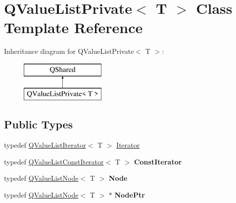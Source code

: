\hypertarget{class_q_value_list_private}{}\section{Q\+Value\+List\+Private$<$ T $>$ Class Template Reference}
\label{class_q_value_list_private}
Inheritance diagram for Q\+Value\+List\+Private$<$ T $>$\+:\begin{figure}[H]
\begin{center}
\leavevmode
\includegraphics[height=2.000000cm]{class_q_value_list_private}
\end{center}
\end{figure}
\subsection*{Public Types}
\begin{DoxyCompactItemize}
\item 
typedef \mbox{\hyperlink{class_q_value_list_iterator}{Q\+Value\+List\+Iterator}}$<$ T $>$ \mbox{\hyperlink{class_q_value_list_private_aef9e14569c19defeaa2b6c8e636fafde}{Iterator}}
\item 
\mbox{\label{class_q_value_list_private_aeaccf04652d772f634ba78357a915b5c}} 
typedef \mbox{\hyperlink{class_q_value_list_const_iterator}{Q\+Value\+List\+Const\+Iterator}}$<$ T $>$ {\bfseries Const\+Iterator}
\item 
\mbox{\label{class_q_value_list_private_a70ca1830018ed991cbd8d957ff62d10a}} 
typedef \mbox{\hyperlink{class_q_value_list_node}{Q\+Value\+List\+Node}}$<$ T $>$ {\bfseries Node}
\item 
\mbox{\label{class_q_value_list_private_a63f9e5099e8c8445e00af7e3f4d7e274}} 
typedef \mbox{\hyperlink{class_q_value_list_node}{Q\+Value\+List\+Node}}$<$ T $>$ $\ast$ {\bfseries Node\+Ptr}
\end{DoxyCompactItemize}
